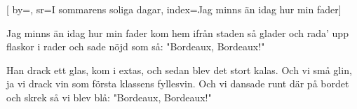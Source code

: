 


[ 		%
	by={},					%
	sr={I sommarens soliga dagar},					%
	index={Jag minns än idag hur min fader}]						%
	
\beginverse*						%
Jag minns än idag hur min fader 
kom hem ifrån staden så glader
och rada' upp flaskor i rader 
och sade nöjd som så: "Bordeaux, Bordeaux!"
\endverse							%

\beginchorus						%
Han drack ett glas, kom i extas, 
och sedan blev det stort kalas. 
Och vi små glin, ja vi drack vin
som första klassens fyllesvin.
Och vi dansade runt där på bordet
och skrek så vi blev blå:
"Bordeaux, Bordeaux!"
\endchorus							%

\endsong							%